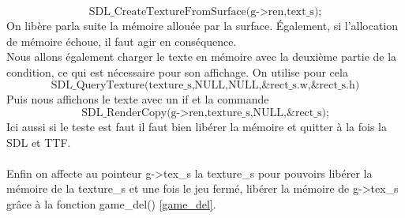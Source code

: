 \documentclass[a4paper,10p]{report}
\begin{document}
\begin{equation*}
\text{SDL\_CreateTextureFromSurface(g->ren,text\_s);}
\end{equation*}
On libère parla suite la mémoire allouée par la surface. Également, si l'allocation de mémoire échoue, il faut agir en conséquence.
\\Nous allons également charger le texte en mémoire avec la deuxième partie de la condition, ce qui est nécessaire pour son affichage. On utilise pour cela
\begin{equation*}
    \text{SDL\_QueryTexture(texture\_s,NULL,NULL,\&rect\_s.w,\& rect\_s.h)}
\end{equation*}
Puis nous affichons le texte avec un if et la commande 
\begin{equation*}
\text{SDL\_RenderCopy(g->ren,texture\_s,NULL,\&rect\_s);}
\end{equation*}
Ici aussi si le teste est faut il faut bien libérer la mémoire et quitter à la fois la SDL et TTF.
\\\\
Enfin on affecte au pointeur g->tex\_s la texture\_s pour pouvoirs libérer la mémoire de la texture\_s et une fois le jeu fermé, libérer la mémoire de g->tex\_s grâce à la fonction game\_del() \ref{game_del}.
\end{document}
